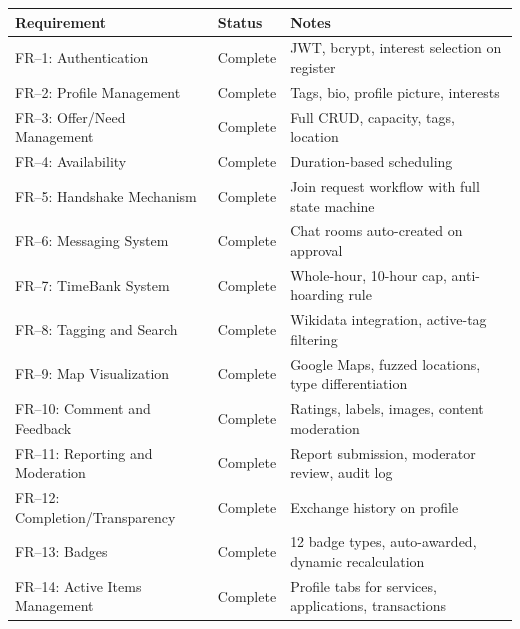 \documentclass[10pt,a4paper]{report}
\begin{document}
\begin{longtable}{|p{5.5cm}|p{2cm}|p{6cm}|}
    \hline
    \textbf{Requirement}                 & \textbf{Status}   & \textbf{Notes}                                             \\
    \hline
    \endhead
    FR--1: Authentication                & Complete          & JWT, bcrypt, interest selection on register                \\
    \hline
    FR--2: Profile Management            & Complete          & Tags, bio, profile picture, interests                      \\
    \hline
    FR--3: Offer/Need Management         & Complete          & Full CRUD, capacity, tags, location                        \\
    \hline
    FR--4: Availability                  & Complete          & Duration-based scheduling                                  \\
    \hline
    FR--5: Handshake Mechanism           & Complete          & Join request workflow with full state machine              \\
    \hline
    FR--6: Messaging System              & Complete          & Chat rooms auto-created on approval                        \\
    \hline
    FR--7: TimeBank System               & Complete          & Whole-hour, 10-hour cap, anti-hoarding rule                \\
    \hline
    FR--8: Tagging and Search            & Complete          & Wikidata integration, active-tag filtering                 \\
    \hline
    FR--9: Map Visualization             & Complete          & Google Maps, fuzzed locations, type differentiation        \\
    \hline
    FR--10: Comment and Feedback         & Complete          & Ratings, labels, images, content moderation                \\
    \hline
    FR--11: Reporting and Moderation     & Complete          & Report submission, moderator review, audit log             \\
    \hline
    FR--12: Completion/Transparency      & Complete          & Exchange history on profile                                \\
    \hline
    FR--13: Badges                       & Complete          & 12 badge types, auto-awarded, dynamic recalculation        \\
    \hline
    FR--14: Active Items Management      & Complete          & Profile tabs for services, applications, transactions      \\

\end{longtable}
\end{document}

